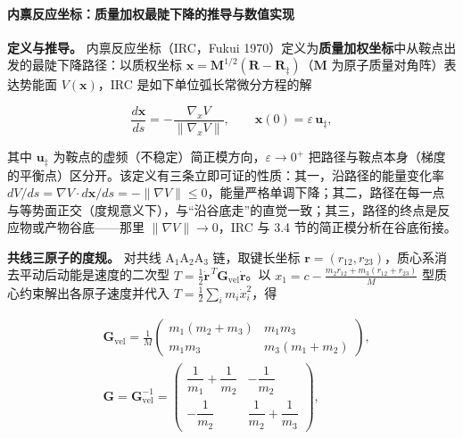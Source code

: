 \documentclass[
]{ctexbook}
\begin{document}
\hypertarget{ux5185ux7980ux53cdux5e94ux5750ux6807ux8d28ux91cfux52a0ux6743ux6700ux9661ux4e0bux964dux7684ux63a8ux5bfcux4e0eux6570ux503cux5b9eux73b0}{%
\paragraph{内禀反应坐标：质量加权最陡下降的推导与数值实现}\label{ux5185ux7980ux53cdux5e94ux5750ux6807ux8d28ux91cfux52a0ux6743ux6700ux9661ux4e0bux964dux7684ux63a8ux5bfcux4e0eux6570ux503cux5b9eux73b0}}

\textbf{定义与推导。} 内禀反应坐标（IRC，Fukui
1970）定义为\textbf{质量加权坐标}中从鞍点出发的最陡下降路径：以质权坐标
\(\mathbf{x}=\mathbf{M}^{1/2}(\mathbf{R}-\mathbf{R}_{\ddagger})\)（\(\mathbf{M}\)
为原子质量对角阵）表达势能面 \(V(\mathbf{x})\)，IRC
是如下单位弧长常微分方程的解

\[\frac{d\mathbf{x}}{ds}=-\frac{\nabla_{x}V}{\lVert\nabla_{x}V\rVert},\qquad \mathbf{x}(0)=\varepsilon\,\mathbf{u}_{\ddagger},\]

其中 \(\mathbf{u}_{\ddagger}\)
为鞍点的虚频（不稳定）简正模方向，\(\varepsilon\to0^{+}\)
把路径与鞍点本身（梯度的平衡点）区分开。该定义有三条立即可证的性质：其一，沿路径的能量变化率
\(dV/ds=\nabla V\cdot d\mathbf{x}/ds=-\lVert\nabla V\rVert\le0\)，能量严格单调下降；其二，路径在每一点与等势面正交（度规意义下），与``沿谷底走''的直觉一致；其三，路径的终点是反应物或产物谷底------那里
\(\lVert\nabla V\rVert\to0\)，IRC 与 3.4 节的简正模分析在谷底衔接。

\textbf{共线三原子的度规。} 对共线
\(\mathrm{A}_1\mathrm{A}_2\mathrm{A}_3\) 链，取键长坐标
\(\mathbf{r}=(r_{12},r_{23})\)，质心系消去平动后动能是速度的二次型
\(T=\tfrac12\dot{\mathbf{r}}^{\,T}\mathbf{G}_{\mathrm{vel}}\dot{\mathbf{r}}\)。以
\(x_1=c-\tfrac{m_2r_{12}+m_3(r_{12}+r_{23})}{M}\)
型质心约束解出各原子速度并代入 \(T=\tfrac12\sum_i m_i\dot{x}_i^2\)，得

\[
\begin{aligned}
&\mathbf{G}_{\mathrm{vel}}=\frac{1}{M}\begin{pmatrix}m_1(m_2+m_3) & m_1m_3\\ m_1m_3 & m_3(m_1+m_2)\end{pmatrix},\\
&\mathbf{G}=\mathbf{G}_{\mathrm{vel}}^{-1}=\begin{pmatrix}\dfrac{1}{m_1}+\dfrac{1}{m_2} & -\dfrac{1}{m_2}\\[4pt] -\dfrac{1}{m_2} & \dfrac{1}{m_2}+\dfrac{1}{m_3}\end{pmatrix},
\end{aligned}
\]
\end{document}
